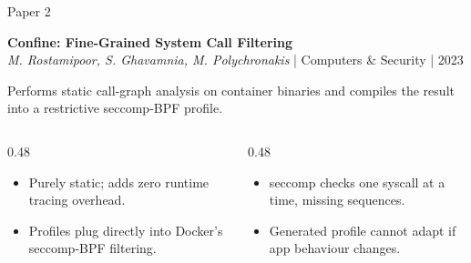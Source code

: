 \documentclass[aspectratio=169,11pt]{beamer}
\begin{document}
\begin{frame}{Paper 2}
\vspace{0.4cm}
\begin{center}
{\Large\bfseries Confine: Fine-Grained System Call Filtering}\\[0.15cm]
{\small\color{DarkGray}\textit{M. Rostamipoor, S. Ghavamnia, M. Polychronakis} | Computers \& Security | 2023}
\end{center}

\vspace{0.2cm}
{\small Performs static call-graph analysis on container binaries and compiles the result into a restrictive seccomp-BPF profile.}

\vspace{0.2cm}
\begin{columns}[T,onlytextwidth]
\begin{column}{0.48\textwidth}
\begin{tcolorbox}[colback=green!5,colframe=green!50!black,title={\textcolor{green!50!black}{\faCheckCircle}~Where It Wins},fonttitle=\bfseries\small,boxrule=0.5pt,arc=2mm,left=2mm,right=2mm,top=1mm,bottom=1mm]
\footnotesize
\begin{itemize}
  \item Purely static; adds zero runtime tracing overhead.
  \item Profiles plug directly into Docker's seccomp-BPF filtering.
\end{itemize}
\end{tcolorbox}
\end{column}

\begin{column}{0.48\textwidth}
\begin{tcolorbox}[colback=red!5,colframe=red!50!black,title={\textcolor{red}{\faTimesCircle}~Where It Struggles},fonttitle=\bfseries\small,boxrule=0.5pt,arc=2mm,left=2mm,right=2mm,top=1mm,bottom=1mm]
\footnotesize
\begin{itemize}
  \item seccomp checks one syscall at a time, missing sequences.
  \item Generated profile cannot adapt if app behaviour changes.
\end{itemize}
\end{tcolorbox}
\end{column}
\end{columns}
\end{frame}
\end{document}
